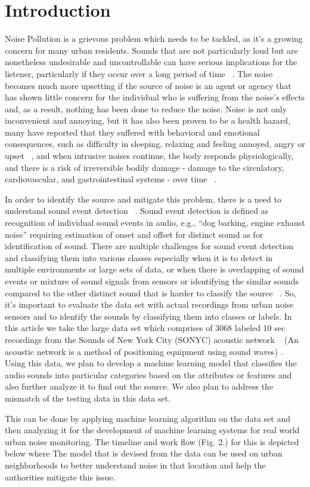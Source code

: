 \section{Introduction}
Noise Pollution is a grievous problem which needs to be tackled, as it’s a growing concern for many urban residents. Sounds that are not particularly loud but are nonetheless undesirable and uncontrollable can have serious implications for the listener, particularly if they occur over a long period of time ~\cite{3}. The noise becomes much more upsetting if the source of noise is an agent or agency that has shown little concern for the individual who is suffering from the noise's effects and, as a result, nothing has been done to reduce the noise. Noise is not only inconvenient and annoying, but it has also been proven to be a health hazard, many have reported that they suffered with behavioral and emotional consequences, such as difficulty in sleeping, relaxing and feeling annoyed, angry or upset ~\cite{2}, and when intrusive noises continue, the body responds physiologically, and there is a risk of irreversible bodily damage - damage to the circulatory, cardiovascular, and gastrointestinal systems - over time ~\cite{1}.


In order to identify the source and mitigate this problem, there is a need to understand sound event detection ~\cite{6}. Sound event detection is defined as recognition of individual sound events in audio, e.g., “dog barking, engine exhaust noise” requiring estimation of onset and offset for distinct sound as for identification of sound. There are multiple challenges for sound event detection and classifying them into various classes especially when it is to detect in multiple environments or large sets of data, or when there is overlapping of sound events or mixture of sound signals from sensors or identifying the similar sounds compared to the other distinct sound that is harder to classify the source ~\cite{8}. So, it's important to evaluate the data set with actual recordings from urban noise sensors and to identify the sounds by classifying them into classes or labels. In this article we take the large data set which comprises of 3068 labeled 10 sec recordings from the Sounds of New York City (SONYC) acoustic network ~\cite{7} (An acoustic network is a method of positioning equipment using sound waves) . Using this data, we plan to develop a machine learning model that classifies the audio sounds into particular categories based on the attributes or features and also further analyze it to find out the source. We also plan to address the mismatch of the testing data in this data set.

This can be done by applying machine learning algorithm on the data set and then analyzing it for the development of machine learning systems for real world urban noise monitoring. The timeline and work flow (Fig. 2.) for this is depicted below where The model that is devised from the data can be used on urban neighborhoods to better understand noise in that location and help the authorities mitigate this issue.